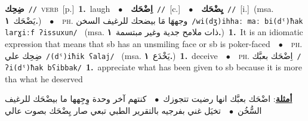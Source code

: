 \documentclass[10pt,a4paper,twoside]{article} %
\begin{document}
\begin{multicols}{2}
{\setlength\topsep{0pt}\textbf{\foreignlanguage{arabic}{ضِحِك}}\ {\color{gray}\texttt{//}\color{black}}\ \textsc{verb}\ [p.]\ \textbf{1.}~laugh\ \ $\bullet$\ \ \setlength\topsep{0pt}\textbf{\foreignlanguage{arabic}{اِضْحَك}}\ {\color{gray}\texttt{//}\color{black}}\ [c.]\ \ $\bullet$\ \ \setlength\topsep{0pt}\textbf{\foreignlanguage{arabic}{يِضْحَك}}\ {\color{gray}\texttt{//}\color{black}}\ [i.]\ \color{gray}(msa. \foreignlanguage{arabic}{يَضْحَك}~\foreignlanguage{arabic}{\textbf{١.}})\color{black}\ \ $\bullet$\ \ \textsc{ph.} \color{gray} \foreignlanguage{arabic}{وجههَا مَا بيضحك للرغيف السخن}\color{black}\ {\color{gray}\texttt{/{\sffamily wi(dʒ)ihhaː maː bi(dˤ)ħak larɣiːf ʔissuxun}/}\color{black}}\ \color{gray} (msa. \foreignlanguage{arabic}{ذات ملامح جدية وغير مبتسمة}~\foreignlanguage{arabic}{\textbf{١.}})\color{black}\ \textbf{1.}~It is an idiomatic expression that means that sb has an unsmiling face or sb is poker-faced\ \ $\bullet$\ \ \textsc{ph.} \color{gray} \foreignlanguage{arabic}{ضِحِك علي}\color{black}\ {\color{gray}\texttt{/{\sffamily (dˤ)iħik ʕalaj}/}\color{black}}\ \color{gray} (msa. \foreignlanguage{arabic}{يَخْدَع}~\foreignlanguage{arabic}{\textbf{١.}})\color{black}\ \textbf{1.}~deceive\ \ $\bullet$\ \ \textsc{ph.} \color{gray} \foreignlanguage{arabic}{اِضْحَك بعبَّك}\color{black}\ {\color{gray}\texttt{/{\sffamily ʔi(dˤ)ħak bʕibbak}/}\color{black}}\ \textbf{1.}~appreciate what has been given to sb because it is more tha what he deserved\  \begin{flushright}\color{gray}\foreignlanguage{arabic}{\textbf{\underline{\foreignlanguage{arabic}{أمثلة}}}: اضْحَك بعبَّك انها رضيت تتجوزك\ $\bullet$\ \  كنتهم آخر وحدة وِجِهها ما بيضْحَك للرغيف السُّخُن\ $\bullet$\ \  تخيَل غني بفرجيه بالتقرير الطبي تبعي صار يِضْحَك بصوت عالي}\end{flushright}\color{black}} \vspace{2mm}


\end{multicols}
\end{document}

